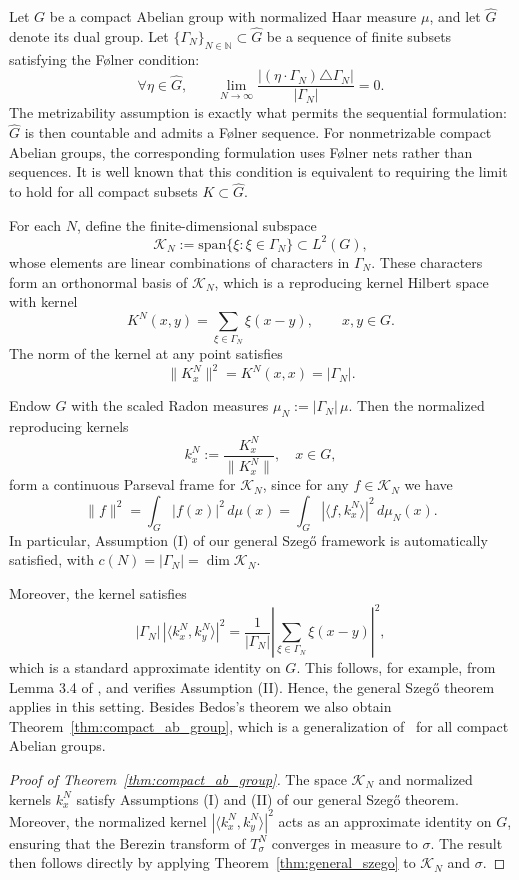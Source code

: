 \documentclass{amsart}
\theoremstyle{definition}
\theoremstyle{remark}
\numberwithin{equation}{section}
\begin{document}
Let $G$ be a compact Abelian group with normalized Haar measure $\mu$, and let $\hat{G}$ denote its dual group. Let $\{\Gamma_N\}_{N\in\mathbb{N}} \subset \hat{G}$ be a sequence of finite subsets satisfying the F\o lner condition:
\[
\forall \eta \in \hat{G}, \qquad \lim_{N\to\infty} \frac{|(\eta \cdot \Gamma_N) \triangle \Gamma_N|}{|\Gamma_N|} = 0.
\]
The metrizability assumption is exactly what permits the sequential formulation: $\widehat G$ is then countable and admits a F{\o}lner sequence. For nonmetrizable compact Abelian groups, the corresponding formulation uses F{\o}lner nets rather than sequences.
It is well known that this condition is equivalent to requiring the limit to hold for all compact subsets $K \subset \hat{G}$.

For each $N$, define the finite-dimensional subspace 
\[
\mathcal{K}_N := \mathrm{span}\{\xi : \xi \in \Gamma_N\} \subset L^2(G),
\] 
whose elements are linear combinations of characters in $\Gamma_N$. These characters form an orthonormal basis of $\mathcal{K}_N$, which is a reproducing kernel Hilbert space with kernel
\[
K^N(x,y) = \sum_{\xi \in \Gamma_N} \xi(x-y), \qquad x,y \in G.
\]
The norm of the kernel at any point satisfies
\[
\|K^N_x\|^2 = K^N(x,x) = |\Gamma_N|.
\]

Endow $G$ with the scaled Radon measures $\mu_N := |\Gamma_N| \, \mu$. Then the normalized reproducing kernels 
\[
k^N_x := \frac{K^N_x}{\|K^N_x\|}, \quad x \in G,
\]
form a continuous Parseval frame for $\mathcal{K}_N$, since for any $f \in \mathcal{K}_N$ we have
\[
\|f\|^2 = \int_G |f(x)|^2 \, d\mu(x) = \int_G |\langle f, k^N_x \rangle|^2 \, d\mu_N(x).
\]
In particular, Assumption (I) of our general Szeg\H{o} framework is automatically satisfied, with $c(N)=|\Gamma_N|=\dim \mathcal{K}_N$.

Moreover, the kernel satisfies
\[
|\Gamma_N| \, |\langle k^N_x, k^N_y \rangle|^2 = \frac{1}{|\Gamma_N|} \left| \sum_{\xi \in \Gamma_N} \xi(x-y) \right|^2,
\]
which is a standard approximate identity on $G$. This follows, for example, from Lemma 3.4 of \cite{coifman1973operators}, and verifies Assumption (II). Hence, the general Szeg\H{o} theorem applies in this setting. Besides Bedos's theorem we also obtain Theorem~\ref{thm:compact_ab_group}, which is a  generalization of~\cite{guo2024first} for all compact Abelian groups.

\begin{proof}[Proof of Theorem~\ref{thm:compact_ab_group}]
The space $\mathcal{K}_N$ and normalized kernels $k^N_x$ satisfy Assumptions (I) and (II) of our general Szeg\H{o} theorem. Moreover, the normalized kernel $|\langle k^N_x, k^N_y \rangle|^2$ acts as an approximate identity on $G$, ensuring that the Berezin transform of $T_\sigma^N$ converges in measure to $\sigma$. The result then follows directly by applying Theorem~\ref{thm:general_szego} to $\mathcal{K}_N$ and $\sigma$.
\end{proof}
\end{document}
